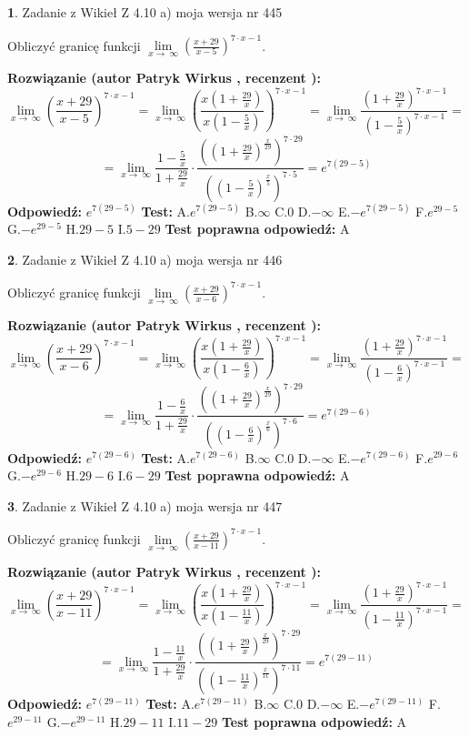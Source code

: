 \documentclass[12pt, a4paper]{article}
\theoremstyle{definition} %
\newtheorem{zad}{}
\newcommand{\zadStart}[1]{\begin{zad}#1\newline}
\newcommand{\zadStop}{\end{zad}}
\newcommand{\rozwStart}[2]{\noindent \textbf{Rozwiązanie (autor #1 , recenzent #2): }\newline}
\newcommand{\rozwStop}{\newline}
\newcommand{\odpStart}{\noindent \textbf{Odpowiedź:}\newline}
\newcommand{\odpStop}{\newline}
\newcommand{\testStart}{\noindent \textbf{Test:}\newline}
\newcommand{\testStop}{\newline}
\newcommand{\kluczStart}{\noindent \textbf{Test poprawna odpowiedź:}\newline}
\newcommand{\kluczStop}{\newline}
\begin{document}
\zadStart{Zadanie z Wikieł Z 4.10 a) moja wersja nr 445}


Obliczyć granicę funkcji  $\lim\limits_{x\to\ \infty}(\frac{x+29}{x-5})^{7\cdot x-1}$.
\zadStop
\rozwStart{Patryk Wirkus}{}
$$\lim\limits_{x\to\ \infty}(\frac{x+29}{x-5})^{7\cdot x-1} = \lim\limits_{x\to\ \infty}(\frac{x(1+\frac{29}{x})}{x(1-\frac{5}{x})})^{7\cdot x-1}=\lim\limits_{x\to\ \infty}\frac{(1+\frac{29}{x})^{7\cdot x-1}}{(1-\frac{5}{x})^{7\cdot x-1}}=$$
$$=\lim\limits_{x\to\ \infty}\frac{1-\frac{5}{x}}{1+\frac{29}{x}}\cdot\frac{((1+\frac{29}{x})^{\frac{x}{29}})^{7\cdot29}}{((1-\frac{5}{x})^{\frac{x}{5}})^{7\cdot5}}=e^{7(29-5)}$$
\rozwStop
\odpStart
$e^{7(29-5)}$
\odpStop
\testStart
A.$e^{7(29-5)}$ B.$\infty$ C.$0$ D.$-\infty$ E.$-e^{7(29-5)}$
F.$e^{29-5}$ G.$-e^{29-5}$
H.$29-5$
I.$5-29$
\testStop
\kluczStart
A
\kluczStop



\zadStart{Zadanie z Wikieł Z 4.10 a) moja wersja nr 446}


Obliczyć granicę funkcji  $\lim\limits_{x\to\ \infty}(\frac{x+29}{x-6})^{7\cdot x-1}$.
\zadStop
\rozwStart{Patryk Wirkus}{}
$$\lim\limits_{x\to\ \infty}(\frac{x+29}{x-6})^{7\cdot x-1} = \lim\limits_{x\to\ \infty}(\frac{x(1+\frac{29}{x})}{x(1-\frac{6}{x})})^{7\cdot x-1}=\lim\limits_{x\to\ \infty}\frac{(1+\frac{29}{x})^{7\cdot x-1}}{(1-\frac{6}{x})^{7\cdot x-1}}=$$
$$=\lim\limits_{x\to\ \infty}\frac{1-\frac{6}{x}}{1+\frac{29}{x}}\cdot\frac{((1+\frac{29}{x})^{\frac{x}{29}})^{7\cdot29}}{((1-\frac{6}{x})^{\frac{x}{6}})^{7\cdot6}}=e^{7(29-6)}$$
\rozwStop
\odpStart
$e^{7(29-6)}$
\odpStop
\testStart
A.$e^{7(29-6)}$ B.$\infty$ C.$0$ D.$-\infty$ E.$-e^{7(29-6)}$
F.$e^{29-6}$ G.$-e^{29-6}$
H.$29-6$
I.$6-29$
\testStop
\kluczStart
A
\kluczStop



\zadStart{Zadanie z Wikieł Z 4.10 a) moja wersja nr 447}


Obliczyć granicę funkcji  $\lim\limits_{x\to\ \infty}(\frac{x+29}{x-11})^{7\cdot x-1}$.
\zadStop
\rozwStart{Patryk Wirkus}{}
$$\lim\limits_{x\to\ \infty}(\frac{x+29}{x-11})^{7\cdot x-1} = \lim\limits_{x\to\ \infty}(\frac{x(1+\frac{29}{x})}{x(1-\frac{11}{x})})^{7\cdot x-1}=\lim\limits_{x\to\ \infty}\frac{(1+\frac{29}{x})^{7\cdot x-1}}{(1-\frac{11}{x})^{7\cdot x-1}}=$$
$$=\lim\limits_{x\to\ \infty}\frac{1-\frac{11}{x}}{1+\frac{29}{x}}\cdot\frac{((1+\frac{29}{x})^{\frac{x}{29}})^{7\cdot29}}{((1-\frac{11}{x})^{\frac{x}{11}})^{7\cdot11}}=e^{7(29-11)}$$
\rozwStop
\odpStart
$e^{7(29-11)}$
\odpStop
\testStart
A.$e^{7(29-11)}$ B.$\infty$ C.$0$ D.$-\infty$ E.$-e^{7(29-11)}$
F.$e^{29-11}$ G.$-e^{29-11}$
H.$29-11$
I.$11-29$
\testStop
\kluczStart
A
\kluczStop
\end{document}
